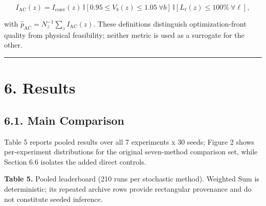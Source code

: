 \documentclass[
  10pt,
  a4paper,
]{article}
\begin{document}
\[
I_{\mathrm{AC}}(z)=
I_{\mathrm{conv}}(z)\,
\mathbb I[0.95\leq V_b(z)\leq1.05\ \forall b]\,
\mathbb I[L_\ell(z)\leq100\%\ \forall\ell],
\]

with \(\widehat p_{\mathrm{AC}}=N_z^{-1}\sum_z I_{\mathrm{AC}}(z)\).
These definitions distinguish optimization-front quality from physical
feasibility; neither metric is used as a surrogate for the other.

\begin{center}\rule{0.5\linewidth}{0.5pt}\end{center}

\section{6. Results}\label{results}

\subsection{6.1. Main Comparison}\label{main-comparison}

Table 5 reports pooled results over all 7 experiments x 30 seeds; Figure
2 shows per-experiment distributions for the original seven-method
comparison set, while Section 6.6 isolates the added direct controls.

\textbf{Table 5.} Pooled leaderboard (210 runs per stochastic method).
Weighted Sum is deterministic; its repeated archive rows provide
rectangular provenance and do not constitute seeded inference.
\end{document}
